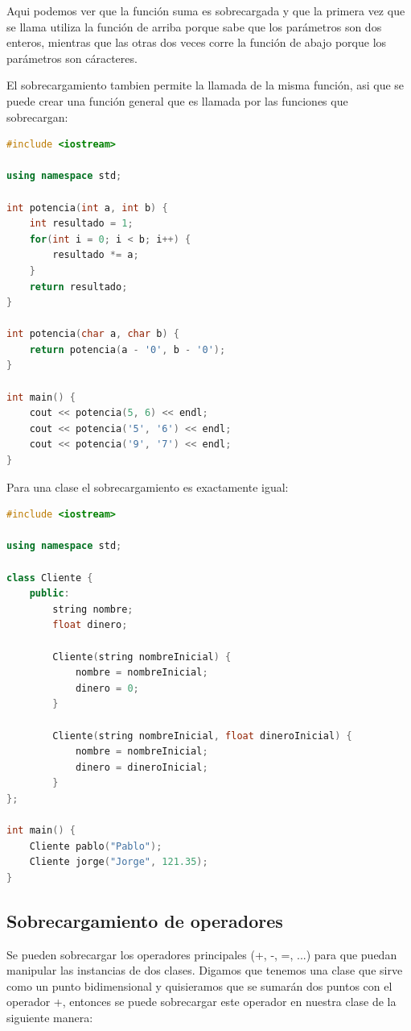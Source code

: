 \documentclass{article}
\begin{document}
Aqui podemos ver que la función suma es sobrecargada y que la primera vez que se llama utiliza la función de arriba porque sabe que los parámetros son dos enteros, mientras que las otras dos veces corre la función de abajo porque los parámetros son cáracteres.

El sobrecargamiento tambien permite la llamada de la misma función, asi que se puede crear una función general que es llamada por las funciones que sobrecargan:

\begin{lstlisting}[language=C++, title=Sobrecargamiento]
#include <iostream>

using namespace std;

int potencia(int a, int b) {
	int resultado = 1;
	for(int i = 0; i < b; i++) {
		resultado *= a;
	}
	return resultado;
}

int potencia(char a, char b) {
	return potencia(a - '0', b - '0');
}

int main() {
	cout << potencia(5, 6) << endl;
	cout << potencia('5', '6') << endl;
	cout << potencia('9', '7') << endl;
}
\end{lstlisting}

Para una clase el sobrecargamiento es exactamente igual:

\begin{lstlisting}[language=C++, title=Sobrecargamiento de clases]
#include <iostream>

using namespace std;

class Cliente {
	public:
		string nombre;
		float dinero;

		Cliente(string nombreInicial) {
			nombre = nombreInicial;
			dinero = 0;
		}

		Cliente(string nombreInicial, float dineroInicial) {
			nombre = nombreInicial;
			dinero = dineroInicial;
		}
};

int main() {
	Cliente pablo("Pablo");
	Cliente jorge("Jorge", 121.35);
}
\end{lstlisting}

\subsection{Sobrecargamiento de operadores}

Se pueden sobrecargar los operadores principales (+, -, =, ...) para que puedan manipular las instancias de dos clases. Digamos que tenemos una clase que sirve como un punto bidimensional y quisieramos que se sumarán dos puntos con el operador +, entonces se puede sobrecargar este operador en nuestra clase de la siguiente manera:
\end{document}
